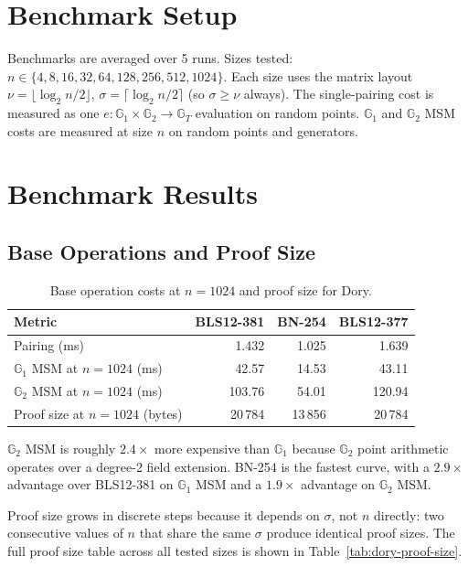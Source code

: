 \section{Benchmark Setup}

Benchmarks are averaged over 5 runs. Sizes tested:
$n \in \{4, 8, 16, 32, 64, 128, 256, 512, 1024\}$.
Each size uses the matrix layout
$\nu = \lfloor \log_2 n / 2 \rfloor$,
$\sigma = \lceil \log_2 n / 2 \rceil$ (so $\sigma \geq \nu$ always).
The single-pairing cost is measured as one
$e : \mathbb{G}_1 \times \mathbb{G}_2 \to \mathbb{G}_T$ evaluation on random
points. $\mathbb{G}_1$ and $\mathbb{G}_2$ MSM costs are measured at size $n$
on random points and generators.

\section{Benchmark Results}

\subsection{Base Operations and Proof Size}

\begin{table}[H]
\centering
\caption{Base operation costs at $n = 1024$ and proof size for Dory.}
\label{tab:dory-base}
\begin{tabular}{lrrr}
\toprule
\textbf{Metric} & \textbf{BLS12-381} & \textbf{BN-254} & \textbf{BLS12-377} \\
\midrule
Pairing (ms)                           & 1.432  & 1.025  & 1.639  \\
$\mathbb{G}_1$ MSM at $n=1024$ (ms)   & 42.57  & 14.53  & 43.11  \\
$\mathbb{G}_2$ MSM at $n=1024$ (ms)   & 103.76 & 54.01  & 120.94 \\
Proof size at $n=1024$ (bytes)         & 20\,784 & 13\,856 & 20\,784 \\
\bottomrule
\end{tabular}
\end{table}

$\mathbb{G}_2$ MSM is roughly $2.4\times$ more expensive than $\mathbb{G}_1$
because $\mathbb{G}_2$ point arithmetic operates over a degree-2 field
extension. BN-254 is the fastest curve, with a $2.9\times$ advantage over
BLS12-381 on $\mathbb{G}_1$ MSM and a $1.9\times$ advantage on
$\mathbb{G}_2$ MSM.

Proof size grows in discrete steps because it depends on $\sigma$, not $n$
directly: two consecutive values of $n$ that share the same $\sigma$ produce
identical proof sizes. The full proof size table across all tested sizes is
shown in Table~\ref{tab:dory-proof-size}.

